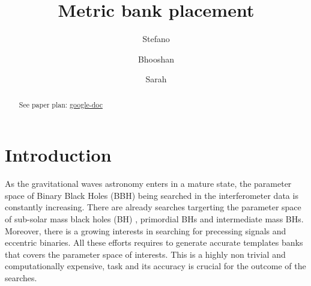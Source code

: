 \documentclass[twocolumn,showpacs,preprintnumbers,nofootinbib,prd,
superscriptaddress,10pt]{revtex4-1}
\begin{document}
\begin{abstract}
	See paper plan: \href{https://docs.google.com/document/d/1O8z0aDlXtV0LyrtK60vaQDzk9iiCsrjj1ThRGX1tX-0/edit}{google-doc}

\end{abstract}
	
	\title{Metric bank placement}
	\author{Stefano }

	\author{Bhooshan }
        
	\author{Sarah }
	\maketitle

	\tableofcontents

\section{Introduction}

As the gravitational waves astronomy enters in a mature state, the parameter space of Binary Black Holes (BBH) being searched in the interferometer data is constantly increasing. There are already searches targerting the parameter space of sub-solar mass black holes (BH) \cite{}, primordial BHs \cite{} and intermediate mass BHs. Moreover, there is a growing interests in searching for precessing signals and eccentric binaries.
All these efforts requires to generate accurate templates banks that covers the parameter space of interests. This is a highly non trivial and computationally expensive, task and its accuracy is crucial for the outcome of the searches.
\end{document}
